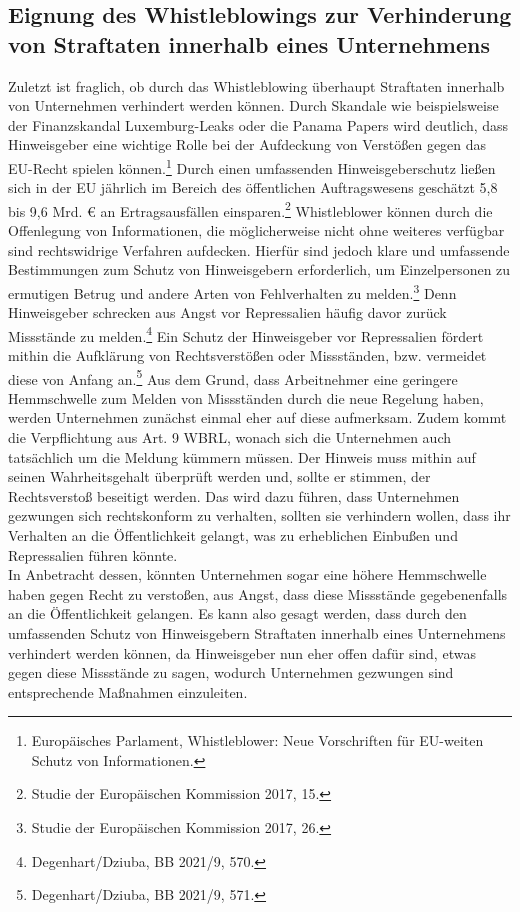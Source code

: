 \subsection{Eignung des Whistleblowings zur Verhinderung von Straftaten innerhalb eines Unternehmens}

Zuletzt ist fraglich, ob durch das Whistleblowing überhaupt Straftaten innerhalb von Unternehmen verhindert werden können.
Durch Skandale wie beispielsweise der Finanzskandal Luxemburg-Leaks oder die Panama Papers wird deutlich, dass Hinweisgeber eine wichtige Rolle bei der Aufdeckung von Verstößen gegen das EU-Recht spielen können.\footnote{Europäisches Parlament, Whistleblower: Neue Vorschriften für EU-weiten Schutz von Informationen.}
Durch einen umfassenden Hinweisgeberschutz ließen sich in der EU jährlich im Bereich des öffentlichen Auftragswesens geschätzt 5,8 bis 9,6 Mrd. € an Ertragsausfällen einsparen.\footnote{Studie der Europäischen Kommission 2017, 15.}
Whistleblower können durch die Offenlegung von Informationen, die möglicherweise nicht ohne weiteres verfügbar sind rechtswidrige Verfahren aufdecken.
Hierfür sind jedoch klare und umfassende Bestimmungen zum Schutz von Hinweisgebern erforderlich, um Einzelpersonen zu ermutigen Betrug und andere Arten von Fehlverhalten zu melden.\footnote{Studie der Europäischen Kommission 2017, 26.}
Denn Hinweisgeber schrecken aus Angst vor Repressalien häufig davor zurück Missstände zu melden.\footnote{Degenhart/Dziuba, BB 2021/9, 570.}
Ein Schutz der Hinweisgeber vor Repressalien fördert mithin die Aufklärung von Rechtsverstößen oder Missständen, bzw. vermeidet diese von Anfang an.\footnote{Degenhart/Dziuba, BB 2021/9, 571.}
Aus dem Grund, dass Arbeitnehmer eine geringere Hemmschwelle zum Melden von Missständen durch die neue Regelung haben, werden Unternehmen zunächst einmal eher auf diese aufmerksam. 
Zudem kommt die Verpflichtung aus Art. 9 WBRL, wonach sich die Unternehmen auch tatsächlich um die Meldung kümmern müssen. 
Der Hinweis muss mithin auf seinen Wahrheitsgehalt überprüft werden und, sollte er stimmen, der Rechtsverstoß beseitigt werden.
Das wird dazu führen, dass Unternehmen gezwungen sich rechtskonform zu verhalten, sollten sie verhindern wollen, dass ihr Verhalten an die Öffentlichkeit gelangt, was zu erheblichen Einbußen und Repressalien führen könnte.\\
In Anbetracht dessen, könnten Unternehmen sogar eine höhere Hemmschwelle haben gegen Recht zu verstoßen, aus Angst, dass diese Missstände gegebenenfalls an die Öffentlichkeit gelangen.
Es kann also gesagt werden, dass durch den umfassenden Schutz von Hinweisgebern Straftaten innerhalb eines Unternehmens verhindert werden können, da Hinweisgeber nun eher offen dafür sind, etwas gegen diese Missstände zu sagen, wodurch Unternehmen gezwungen sind entsprechende Maßnahmen einzuleiten.